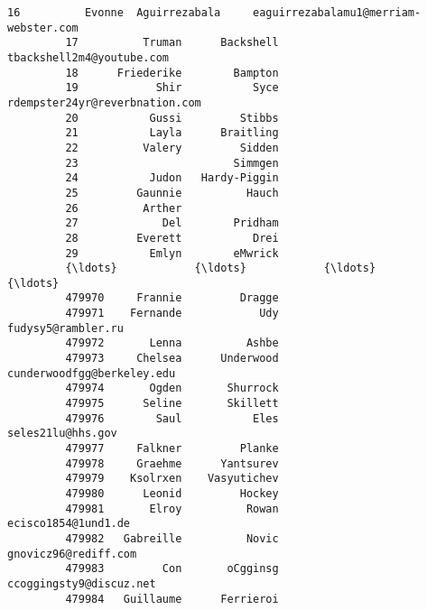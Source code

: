 \documentclass[11pt]{article}
\begin{document}
\begin{Verbatim}[commandchars=\\\{\}]
         16          Evonne  Aguirrezabala     eaguirrezabalamu1@merriam-webster.com   
         17          Truman      Backshell                 tbackshell2m4@youtube.com   
         18      Friederike        Bampton                                             
         19            Shir           Syce            rdempster24yr@reverbnation.com   
         20           Gussi         Stibbs                                             
         21           Layla      Braitling                                             
         22          Valery         Sidden                                             
         23                        Simmgen                                             
         24           Judon   Hardy-Piggin                                             
         25         Gaunnie          Hauch                                             
         26          Arther                                                            
         27             Del        Pridham                                             
         28         Everett           Drei                                             
         29           Emlyn        eMwrick                                             
         {\ldots}            {\ldots}            {\ldots}                                       {\ldots}   
         479970     Frannie         Dragge                                             
         479971    Fernande            Udy                        fudysy5@rambler.ru   
         479972       Lenna          Ashbe                                             
         479973     Chelsea      Underwood                cunderwoodfgg@berkeley.edu   
         479974       Ogden       Shurrock                                             
         479975      Seline       Skillett                                             
         479976        Saul           Eles                         seles21lu@hhs.gov   
         479977     Falkner         Planke                                             
         479978     Graehme      Yantsurev                                             
         479979    Ksolrxen    Vasyutichev                                             
         479980      Leonid         Hockey                                             
         479981       Elroy          Rowan                       ecisco1854@1und1.de   
         479982   Gabreille          Novic                      gnovicz96@rediff.com   
         479983         Con       oCgginsg                   ccoggingsty9@discuz.net   
         479984   Guillaume      Ferrieroi                                             

\end{Verbatim}
\end{document}
